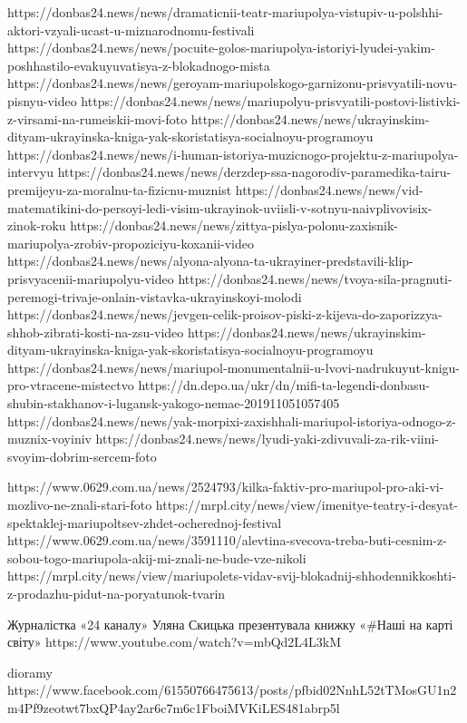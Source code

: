 https://donbas24.news/news/dramaticnii-teatr-mariupolya-vistupiv-u-polshhi-aktori-vzyali-ucast-u-miznarodnomu-festivali
https://donbas24.news/news/pocuite-golos-mariupolya-istoriyi-lyudei-yakim-poshhastilo-evakuyuvatisya-z-blokadnogo-mista
https://donbas24.news/news/geroyam-mariupolskogo-garnizonu-prisvyatili-novu-pisnyu-video
https://donbas24.news/news/mariupolyu-prisvyatili-postovi-listivki-z-virsami-na-rumeiskii-movi-foto
https://donbas24.news/news/ukrayinskim-dityam-ukrayinska-kniga-yak-skoristatisya-socialnoyu-programoyu
https://donbas24.news/news/i-human-istoriya-muzicnogo-projektu-z-mariupolya-intervyu
https://donbas24.news/news/derzdep-ssa-nagorodiv-paramedika-tairu-premijeyu-za-moralnu-ta-fizicnu-muznist
https://donbas24.news/news/vid-matematikini-do-persoyi-ledi-visim-ukrayinok-uviisli-v-sotnyu-naivplivovisix-zinok-roku
https://donbas24.news/news/zittya-pislya-polonu-zaxisnik-mariupolya-zrobiv-propoziciyu-koxanii-video
https://donbas24.news/news/alyona-alyona-ta-ukrayiner-predstavili-klip-prisvyacenii-mariupolyu-video
https://donbas24.news/news/tvoya-sila-pragnuti-peremogi-trivaje-onlain-vistavka-ukrayinskoyi-molodi
https://donbas24.news/news/jevgen-celik-proisov-piski-z-kijeva-do-zaporizzya-shhob-zibrati-kosti-na-zsu-video
https://donbas24.news/news/ukrayinskim-dityam-ukrayinska-kniga-yak-skoristatisya-socialnoyu-programoyu
https://donbas24.news/news/mariupol-monumentalnii-u-lvovi-nadrukuyut-knigu-pro-vtracene-mistectvo
https://dn.depo.ua/ukr/dn/mifi-ta-legendi-donbasu-shubin-stakhanov-i-lugansk-yakogo-nemae-201911051057405
https://donbas24.news/news/yak-morpixi-zaxishhali-mariupol-istoriya-odnogo-z-muznix-voyiniv
https://donbas24.news/news/lyudi-yaki-zdivuvali-za-rik-viini-svoyim-dobrim-sercem-foto

% 
https://www.0629.com.ua/news/2524793/kilka-faktiv-pro-mariupol-pro-aki-vi-mozlivo-ne-znali-stari-foto
https://mrpl.city/news/view/imenitye-teatry-i-desyat-spektaklej-mariupoltsev-zhdet-ocherednoj-festival
https://www.0629.com.ua/news/3591110/alevtina-svecova-treba-buti-cesnim-z-sobou-togo-mariupola-akij-mi-znali-ne-bude-vze-nikoli
https://mrpl.city/news/view/mariupolets-vidav-svij-blokadnij-shhodennikkoshti-z-prodazhu-pidut-na-poryatunok-tvarin

 Журналістка «24 каналу» Уляна Скицька презентувала книжку «#Наші на карті світу» 
https://www.youtube.com/watch?v=mbQd2L4L3kM

dioramy
https://www.facebook.com/61550766475613/posts/pfbid02NnhL52tTMosGU1n2m4Pf9zeotwt7bxQP4ay2ar6c7m6c1FboiMVKiLES481abrp5l
